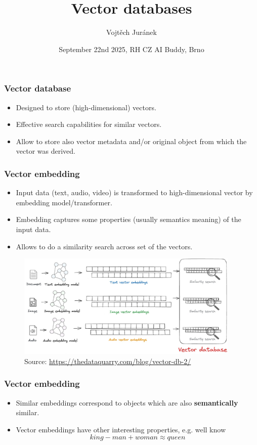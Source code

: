 \documentclass[10pt,utf8]{beamer}
\title{Vector databases}
\author{Vojtěch Juránek}
\institute[IBM]{IBM}
\date{September 22nd 2025, RH CZ AI Buddy, Brno}
\begin{document}
\begin{frame}
    \titlepage
\end{frame}

\begin{frame}
    \frametitle{Vector database}
    \begin{itemize}
        \item Designed to store (high-dimensional) vectors.
        \item Effective search capabilities for similar vectors.
        \item Allow to store also vector metadata and/or original object from which the vector was derived.
    \end{itemize}
\end{frame}

\begin{frame}
    \frametitle{Vector embedding}
    \begin{itemize}
        \item Input data (text, audio, video) is transformed to high-dimensional vector by embedding model/transformer.
        \item Embedding captures some properties (usually semantics meaning) of the input data.
        \item Allows to do a similarity search across set of the vectors.
    \end{itemize}
    
    \vspace{0.1cm}
    
    \begin{figure}
        \centering
        \includegraphics[height=5cm]{./img/media_to_db.eps}
        \caption{\tiny{Source: \url{https://thedataquarry.com/blog/vector-db-2/}}}
    \end{figure}
\end{frame}

\begin{frame}
    \frametitle{Vector embedding}
    \begin{itemize}
        \item Similar embeddings correspond to objects which are also \textbf{semantically} similar.
        \item Vector embeddings have other interesting properties, e.g. well know 
        \begin{equation}
            king - man + woman \approx queen
        \end{equation}
    \end{itemize}
\end{frame}
\end{document}
